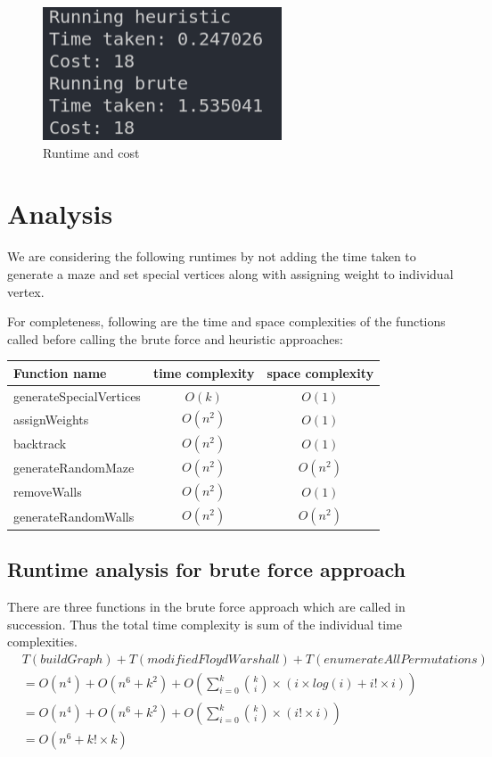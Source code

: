 \documentclass[12pt]{report}
\begin{document}
\begin{figure}
    \centering
    \includegraphics[width=0.33\linewidth]{assets/latex/samePath/stats.png}
    \caption{Runtime and cost}
\end{figure}

\chapter{Analysis}
We are considering the following runtimes by not adding the time taken to generate a maze and set special vertices along with assigning weight to individual vertex.\par
For completeness, following are the time and space complexities of the functions called before calling the brute force and heuristic approaches:

\begin{center}
\begin{tabular}{ |l||c|c| } 
 \hline
 Function name & time complexity &space complexity \\ 
 \hline\hline
 generateSpecialVertices & $O(k)$  & $O(1)$\\
 \hline
 assignWeights & $O(n^2)$& $O(1)$\\ 
 \hline
 backtrack & $O(n^2)$  & $O(1)$\\
 \hline
 generateRandomMaze & $O(n^2)$ & $O(n^2)$ \\ 
 \hline
 removeWalls & $O(n^2)$ & $O(1)$\\ %
 \hline
 generateRandomWalls & $O(n^2)$ & $O(n^2)$ \\ %
 \hline
 
\end{tabular}
\end{center}


\section{Runtime analysis for brute force approach}
There are three functions in the brute force approach which are called in succession. Thus the total time complexity is sum of the individual time complexities.
\begin{equation}
\begin{aligned}
    &T({buildGraph}) + T({modifiedFloydWarshall}) + T({enumerateAllPermutations})\\
    &= O(n^4) + O(n^6 + k^2) + O(\sum_{i=0}^{k}{\binom{k}{i}\times(i\times log(i) + i!\times i)})\\
    &= O(n^4) + O(n^6 + k^2) + O(\sum_{i=0}^{k}{\binom{k}{i}\times(i!\times i)})\\
    &= O(n^6 + k! \times k)
\end{aligned}
\end{equation}
\end{document}
